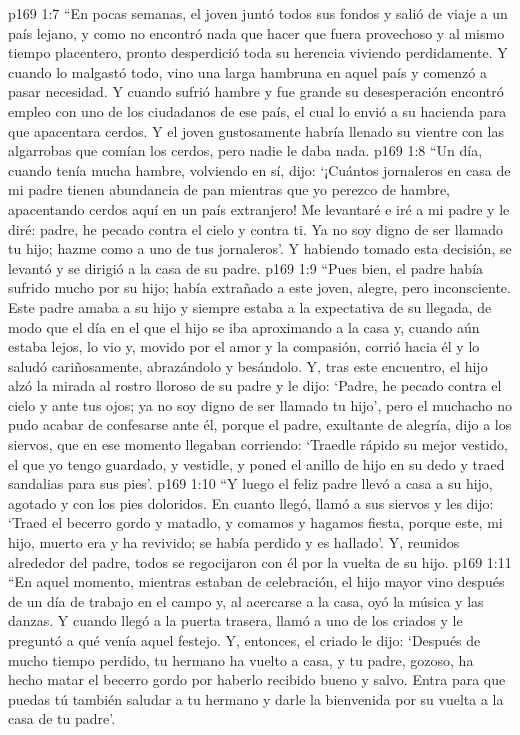 \vs p169 1:7 “En pocas semanas, el joven juntó todos sus fondos y salió de viaje a un país lejano, y como no encontró nada que hacer que fuera provechoso y al mismo tiempo placentero, pronto desperdició toda su herencia viviendo perdidamente. Y cuando lo malgastó todo, vino una larga hambruna en aquel país y comenzó a pasar necesidad. Y cuando sufrió hambre y fue grande su desesperación encontró empleo con uno de los ciudadanos de ese país, el cual lo envió a su hacienda para que apacentara cerdos. Y el joven gustosamente habría llenado su vientre con las algarrobas que comían los cerdos, pero nadie le daba nada.
\vs p169 1:8 “Un día, cuando tenía mucha hambre, volviendo en sí, dijo: ‘¡Cuántos jornaleros en casa de mi padre tienen abundancia de pan mientras que yo perezco de hambre, apacentando cerdos aquí en un país extranjero! Me levantaré e iré a mi padre y le diré: padre, he pecado contra el cielo y contra ti. Ya no soy digno de ser llamado tu hijo; hazme como a uno de tus jornaleros’. Y habiendo tomado esta decisión, se levantó y se dirigió a la casa de su padre.
\vs p169 1:9 “Pues bien, el padre había sufrido mucho por su hijo; había extrañado a este joven, alegre, pero inconsciente. Este padre amaba a su hijo y siempre estaba a la expectativa de su llegada, de modo que el día en el que el hijo se iba aproximando a la casa y, cuando aún estaba lejos, lo vio y, movido por el amor y la compasión, corrió hacia él y lo saludó cariñosamente, abrazándolo y besándolo. Y, tras este encuentro, el hijo alzó la mirada al rostro lloroso de su padre y le dijo: ‘Padre, he pecado contra el cielo y ante tus ojos; ya no soy digno de ser llamado tu hijo’, pero el muchacho no pudo acabar de confesarse ante él, porque el padre, exultante de alegría, dijo a los siervos, que en ese momento llegaban corriendo: ‘Traedle rápido su mejor vestido, el que yo tengo guardado, y vestidle, y poned el anillo de hijo en su dedo y traed sandalias para sus pies’.
\vs p169 1:10 “Y luego el feliz padre llevó a casa a su hijo, agotado y con los pies doloridos. En cuanto llegó, llamó a sus siervos y les dijo: ‘Traed el becerro gordo y matadlo, y comamos y hagamos fiesta, porque este, mi hijo, muerto era y ha revivido; se había perdido y es hallado’. Y, reunidos alrededor del padre, todos se regocijaron con él por la vuelta de su hijo.
\vs p169 1:11 “En aquel momento, mientras estaban de celebración, el hijo mayor vino después de un día de trabajo en el campo y, al acercarse a la casa, oyó la música y las danzas. Y cuando llegó a la puerta trasera, llamó a uno de los criados y le preguntó a qué venía aquel festejo. Y, entonces, el criado le dijo: ‘Después de mucho tiempo perdido, tu hermano ha vuelto a casa, y tu padre, gozoso, ha hecho matar el becerro gordo por haberlo recibido bueno y salvo. Entra para que puedas tú también saludar a tu hermano y darle la bienvenida por su vuelta a la casa de tu padre’.

